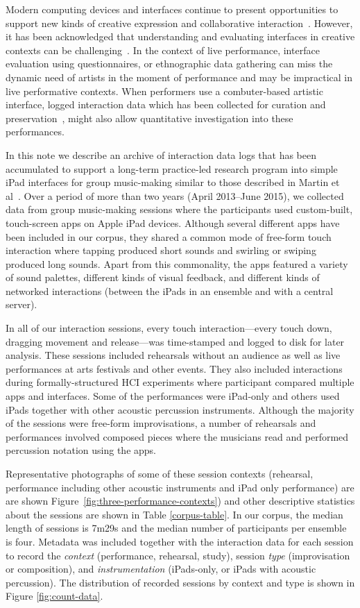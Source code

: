 \documentclass{sigchi}
\begin{document}
Modern computing devices and interfaces continue to present
opportunities to support new kinds of creative expression and
collaborative interaction~\cite{Resnick:2005yu}. However, it has been
acknowledged that understanding and evaluating interfaces in creative
contexts can be challenging~\cite{Shneiderman:2007qv}. In the context
of live performance, interface evaluation using questionnaires, or
ethnographic data gathering can miss the dynamic need of artists in
the moment of performance and may be impractical in live performative
contexts. When performers use a combuter-based artistic interface,
logged interaction data which has been collected for curation and
preservation~\cite{England:2014ys}, might also allow quantitative
investigation into these performances.

In this note we describe an archive of interaction data logs that has
been accumulated to support a long-term practice-led research program
into simple iPad interfaces for group music-making similar to those
described in Martin et al~\cite{Martin:2014cr}. Over a period of more
than two years (April 2013--June 2015), we collected data from group
music-making sessions where the participants used custom-built,
touch-screen apps on Apple iPad devices. Although several different
apps have been included in our corpus, they shared a common mode of
free-form touch interaction where tapping produced short sounds and
swirling or swiping produced long sounds. Apart from this commonality,
the apps featured a variety of sound palettes, different kinds of
visual feedback, and different kinds of networked interactions
(between the iPads in an ensemble and with a central server).

In all of our interaction sessions, every touch interaction---every
touch down, dragging movement and release---was time-stamped and
logged to disk for later analysis. These sessions included rehearsals
without an audience as well as live performances at arts festivals and
other events. They also included interactions during
formally-structured HCI experiments where participant compared
multiple apps and interfaces. Some of the performances were iPad-only
and others used iPads together with other acoustic percussion
instruments. Although the majority of the sessions were free-form
improvisations, a number of rehearsals and performances involved
composed pieces where the musicians read and performed percussion
notation using the apps.

Representative photographs of some of these session contexts
(rehearsal, performance including other acoustic instruments and iPad
only performance) are are shown
Figure~\ref{fig:three-performance-contexts}) and other descriptive
statistics about the sessions are shown in Table \ref{corpus-table}.
In our corpus, the median length of sessions is 7m29s and the median
number of participants per ensemble is four. Metadata was included
together with the interaction data for each session to record the
\emph{context} (performance, rehearsal, study), session \emph{type}
(improvisation or composition), and \emph{instrumentation}
(iPads-only, or iPads with acoustic percussion). The distribution of
recorded sessions by context and type is shown in Figure
\ref{fig:count-data}.
\end{document}
